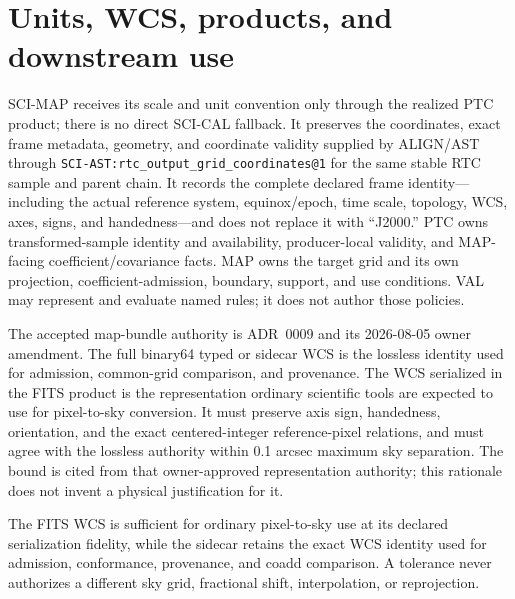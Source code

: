 \documentclass[10pt]{article}
\newcommand{\code}[1]{\nolinkurl{#1}}
\begin{document}
\clearpage
\section{Units, WCS, products, and downstream use}\label{sec:products}
SCI-MAP receives its scale and unit convention only through the realized PTC
product; there is no direct SCI-CAL fallback. It preserves the coordinates,
exact frame metadata, geometry, and coordinate validity supplied by ALIGN/AST
through \code{SCI-AST:rtc_output_grid_coordinates@1} for the same stable RTC
sample and parent chain. It records the complete declared frame identity---
including the actual reference system, equinox/epoch, time scale, topology,
WCS, axes, signs, and handedness---and does not replace it with ``J2000.'' PTC
owns transformed-sample identity and availability, producer-local validity,
and MAP-facing coefficient/covariance facts. MAP owns the target grid and its
own projection, coefficient-admission, boundary, support, and use conditions.
VAL may represent and evaluate named rules; it does not author those policies.

The accepted map-bundle authority is ADR~0009 and its 2026-08-05 owner
amendment. The full binary64 typed or sidecar WCS is the lossless identity used
for admission, common-grid comparison, and provenance. The WCS serialized in
the FITS product is the representation ordinary scientific tools are expected
to use for pixel-to-sky conversion. It must preserve axis sign, handedness,
orientation, and the exact centered-integer reference-pixel relations, and
must agree with the lossless authority within 0.1 arcsec maximum sky
separation. The bound is cited from that owner-approved representation
authority; this rationale does not invent a physical justification for it.

The FITS WCS is sufficient for ordinary pixel-to-sky use at its declared
serialization fidelity, while the sidecar retains the exact WCS identity used
for admission, conformance, provenance, and coadd comparison. A tolerance
never authorizes a different sky grid, fractional shift, interpolation, or
reprojection.
\end{document}
